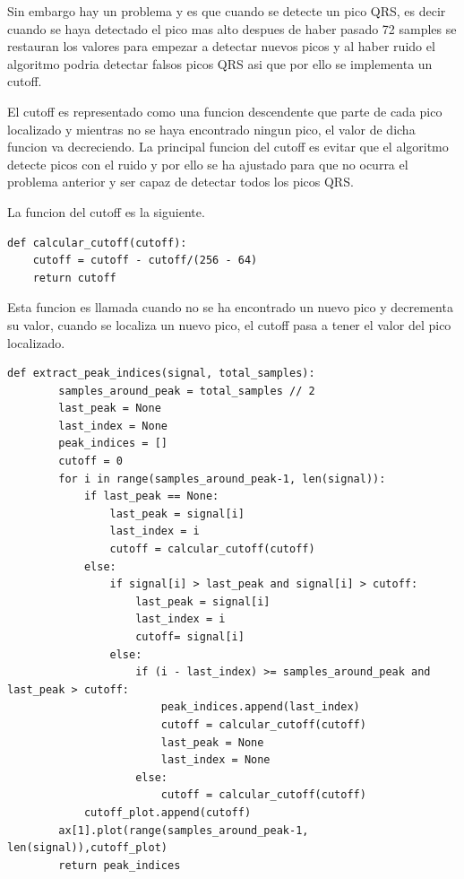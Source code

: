 Sin embargo hay un problema y es que cuando se detecte un pico QRS, es decir cuando se haya detectado el pico 
mas alto despues de haber pasado 72 samples se restauran los valores para empezar a detectar nuevos picos y al
haber ruido el algoritmo podria detectar falsos picos QRS asi que por ello se implementa un cutoff.

El cutoff es representado como una funcion descendente que parte de cada pico localizado y mientras no se haya
encontrado ningun pico, el valor de dicha funcion va decreciendo. La principal funcion del cutoff es evitar que
el algoritmo detecte picos con el ruido y por ello se ha ajustado para que no ocurra el problema anterior y 
ser capaz de detectar todos los picos QRS.

La funcion del cutoff es la siguiente.
\lstset{language=python, breaklines=true, basicstyle=\footnotesize}
\begin{lstlisting}[frame=single]
def calcular_cutoff(cutoff):
    cutoff = cutoff - cutoff/(256 - 64)
    return cutoff
\end{lstlisting}

Esta funcion es llamada cuando no se ha encontrado un nuevo pico y decrementa su valor, cuando se localiza un
nuevo pico, el cutoff pasa a tener el valor del pico localizado.

\lstset{language=python, breaklines=true, basicstyle=\footnotesize}
\begin{lstlisting}[frame=single]
    def extract_peak_indices(signal, total_samples):
        samples_around_peak = total_samples // 2
        last_peak = None
        last_index = None
        peak_indices = []
        cutoff = 0
        for i in range(samples_around_peak-1, len(signal)):
            if last_peak == None:
                last_peak = signal[i]
                last_index = i
                cutoff = calcular_cutoff(cutoff)
            else:
                if signal[i] > last_peak and signal[i] > cutoff:
                    last_peak = signal[i]
                    last_index = i
                    cutoff= signal[i]
                else:
                    if (i - last_index) >= samples_around_peak and last_peak > cutoff:
                        peak_indices.append(last_index)
                        cutoff = calcular_cutoff(cutoff)
                        last_peak = None
                        last_index = None         
                    else:
                        cutoff = calcular_cutoff(cutoff)
            cutoff_plot.append(cutoff)
        ax[1].plot(range(samples_around_peak-1, len(signal)),cutoff_plot)
        return peak_indices
\end{lstlisting}

